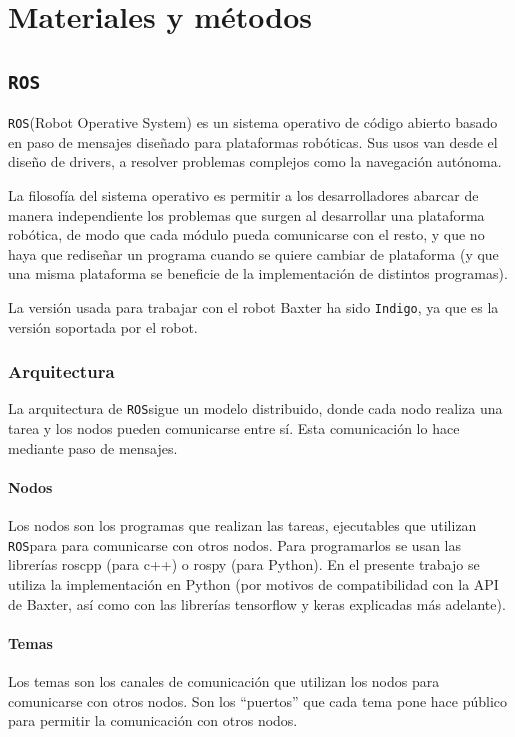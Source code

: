 \chapter{Materiales y métodos}
\newcommand{\ros}{\texttt{ROS}}
\section{\ros}
\ros (Robot Operative System) \cite{ros} es un sistema operativo de código abierto basado en paso de mensajes diseñado para plataformas robóticas. Sus usos van desde el diseño de drivers, a resolver problemas complejos como la navegación autónoma.

La filosofía del sistema operativo es permitir a los desarrolladores abarcar de manera independiente los problemas que surgen al desarrollar una plataforma robótica, de modo que cada módulo pueda comunicarse con el resto, y que no haya que rediseñar un programa cuando se quiere cambiar de plataforma (y que una misma plataforma se beneficie de la implementación de distintos programas).

La versión usada para trabajar con el robot Baxter ha sido \texttt{Indigo}, ya que es la versión soportada por el robot.
\subsection{Arquitectura}
La arquitectura de \ros sigue un modelo distribuido, donde cada nodo realiza una tarea y los nodos pueden comunicarse entre sí. Esta comunicación lo hace mediante paso de mensajes.
\subsubsection{Nodos}
Los nodos son los programas que realizan las tareas, ejecutables que utilizan \ros para para comunicarse con otros nodos. Para programarlos se usan las librerías roscpp (para c++) o rospy (para Python). En el presente trabajo se utiliza la implementación en Python (por motivos de compatibilidad con la API de Baxter, así como con las librerías tensorflow y keras explicadas más adelante).

\subsubsection{Temas}
Los temas son los canales de comunicación que utilizan los nodos para comunicarse con otros nodos. Son los ``puertos'' que cada tema pone hace público para permitir la comunicación con otros nodos.

